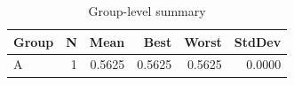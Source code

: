 \begin{table}[htbp]
\centering
\caption{Group-level summary}
\label{tab:group-summary}
\begin{tabular}{lrrrrr}
\toprule
\textbf{Group} & \textbf{N} & \textbf{Mean} & \textbf{Best} & \textbf{Worst} & \textbf{StdDev} \\
\midrule
A & 1 & 0.5625 & 0.5625 & 0.5625 & 0.0000 \\
\bottomrule
\end{tabular}
\end{table}